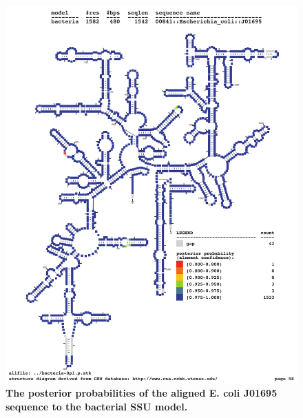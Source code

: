 \begin{figure}
\begin{center}
\includegraphics[width=5.7in]{Figures/ecoli-prob}
\end{center}
\caption{\textbf{The posterior probabilities of the aligned E. coli
J01695 sequence to the bacterial SSU model.}}
\label{fig:ecoli-prob}
\end{figure}




